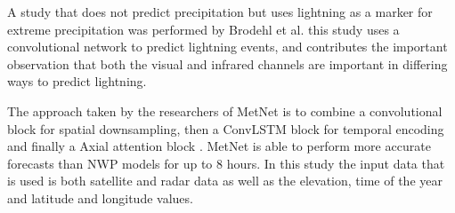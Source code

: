 A study that does not predict precipitation but uses lightning as a marker for extreme precipitation was performed by Brodehl et al. \cite{predictionLightning} this study uses a convolutional network to predict lightning events, and contributes the important observation that both the visual and infrared channels are important in differing ways to predict lightning.
\medskip

The approach taken by the researchers of MetNet \cite{sønderby2020metnet} is to combine a convolutional block for spatial downsampling, then a ConvLSTM block for temporal encoding and finally a Axial attention block \cite{vaswani2017attention}. MetNet is able to perform more accurate forecasts than NWP models for up to 8 hours. In this study the input data that is used is both satellite and radar data as well as the elevation, time of the year and latitude and longitude values.